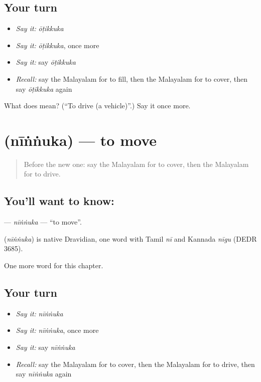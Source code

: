 \subsection*{Your turn}
\begin{itemize}
\raggedright
  \item \emph{Say it:} \emph{ōṭikkuka}
  \item \emph{Say it:} \emph{ōṭikkuka}, once more
  \item \emph{Say it:} say \emph{ōṭikkuka}
  \item \emph{Recall:} say the Malayalam for to fill, then the Malayalam for to cover, then say \emph{ōṭikkuka} again
\end{itemize}

\begin{tcolorbox}[breakable,colback=teal!4,colframe=teal!35!black,title={Before you move on}]
What does  mean? (\textquotedblleft{}To drive (a vehicle)\textquotedblright{}.) Say it once more.
\end{tcolorbox}
\section[\texorpdfstring{\ml{നീങ്ങുക} (nīṅṅuka)}{നീങ്ങുക (nīṅṅuka)}]{ (nīṅṅuka) — to move}

\label{lesson:ML-C225-ninnuka}



\begin{quote}
Before the new one: say the Malayalam for to cover, then the Malayalam for to drive.
\end{quote}

\subsection*{You'll want to know: }
\textbf{} — \emph{nīṅṅuka} — \textquotedblleft{}to move\textquotedblright{}.

\begin{cousinweb}
\textbf{} (\emph{nīṅṅuka}) is native Dravidian, one word with Tamil \emph{nī} and Kannada \emph{nīgu} (DEDR 3685).
\end{cousinweb}

\begin{grammarlens}[title={What you've built}]
One more word for this chapter.
\end{grammarlens}

\subsection*{Your turn}
\begin{itemize}
\raggedright
  \item \emph{Say it:} \emph{nīṅṅuka}
  \item \emph{Say it:} \emph{nīṅṅuka}, once more
  \item \emph{Say it:} say \emph{nīṅṅuka}
  \item \emph{Recall:} say the Malayalam for to cover, then the Malayalam for to drive, then say \emph{nīṅṅuka} again
\end{itemize}

